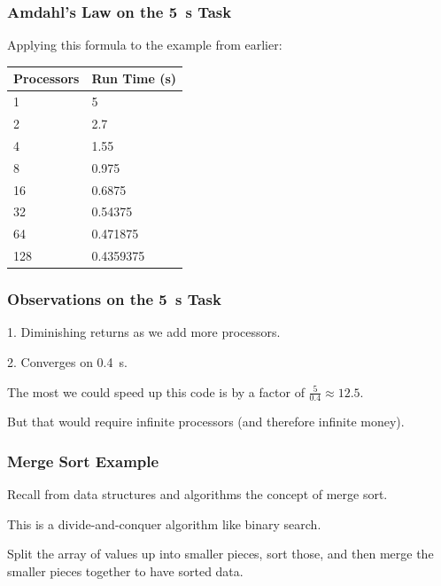 \begin{frame}
	\frametitle{Amdahl's Law on the 5~s Task}

	Applying this formula to the example from earlier:

	\begin{center}
		\begin{tabular}{l|l}
			\textbf{Processors} & \textbf{Run Time (s)} \\ \hline
			1                   & 5                     \\
			2                   & 2.7                   \\
			4                   & 1.55                  \\
			8                   & 0.975                 \\
			16                  & 0.6875                \\
			32                  & 0.54375               \\
			64                  & 0.471875              \\
			128                 & 0.4359375             \\
		\end{tabular}
	\end{center}

\end{frame}


\begin{frame}
	\frametitle{Observations on the 5~s Task}

	1. Diminishing returns as we add more processors.

	2. Converges on 0.4~s.

	The most we could speed up this code is by a factor of $\frac{5}{0.4}\approx 12.5$.

	But that would require infinite processors (and therefore infinite money).

\end{frame}


\begin{frame}
	\frametitle{Merge Sort Example}

	Recall from data structures and algorithms the concept of merge sort.

	This is a divide-and-conquer algorithm like binary search.

	Split the array of values up into smaller pieces, sort those, and then merge the smaller pieces together to have sorted data.


\end{frame}


